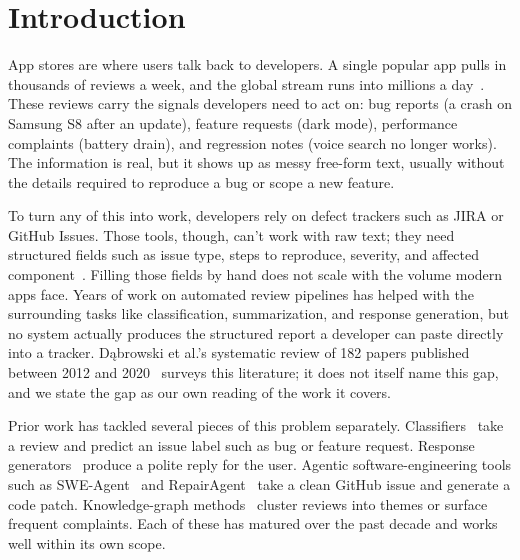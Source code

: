 \documentclass[preprint,12pt]{elsarticle}
\begin{document}
\linenumbers

\section{Introduction}\label{introduction}

App stores are where users talk back to developers. A single popular app pulls in thousands of reviews a week, and the global stream runs into millions a day~\cite{maalej2015bug, gao2019automating, dkabrowski2022analysing}. These reviews carry the signals developers need to act on: bug reports (a crash on Samsung S8 after an update), feature requests (dark mode), performance complaints (battery drain), and regression notes (voice search no longer works). The information is real, but it shows up as messy free-form text, usually without the details required to reproduce a bug or scope a new feature.

To turn any of this into work, developers rely on defect trackers such as JIRA or GitHub Issues. Those tools, though, can't work with raw text; they need structured fields such as issue type, steps to reproduce, severity, and affected component~\cite{chaparro2017detecting,
zimmermann2010makes}. Filling those fields by hand does not scale with the volume modern apps face. Years of work on automated review pipelines has helped with the surrounding tasks like classification, summarization, and response generation, but no system actually produces the structured report a developer can paste directly into a tracker. D{\k a}browski et al.'s systematic review of 182 papers published between 2012 and
2020~\cite{dkabrowski2022analysing} surveys this literature; it does not itself name this gap, and
we state the gap as our own reading of the work it covers.

Prior work has tackled several pieces of this problem separately.
  Classifiers~\cite{maalej2015bug, chen2014ar, villarroel2016release, di2017surf} take a review
  and predict an issue label such as bug or feature request. Response
  generators~\cite{gao2019automating, gao2021automating, lewis2020retrieval} produce a polite reply for the user.
   Agentic software-engineering tools such as SWE-Agent~\cite{yang2024swe} and
  RepairAgent~\cite{bouzenia2025repairagent} take a clean GitHub issue and generate a code
  patch. Knowledge-graph methods~\cite{de2025reviewgraph, yu2024knowledge, keertipati2016approaches} cluster
  reviews into themes or surface frequent complaints. Each of these has matured over the past
  decade and works well within its own scope.
\end{document}
